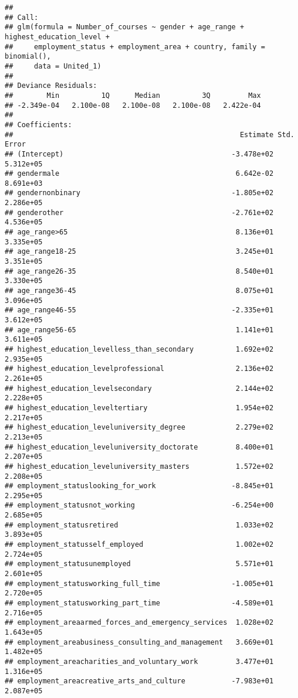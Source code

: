 \documentclass[
]{article}
\begin{document}
\begin{verbatim}
## 
## Call:
## glm(formula = Number_of_courses ~ gender + age_range + highest_education_level + 
##     employment_status + employment_area + country, family = binomial(), 
##     data = United_1)
## 
## Deviance Residuals: 
##        Min          1Q      Median          3Q         Max  
## -2.349e-04   2.100e-08   2.100e-08   2.100e-08   2.422e-04  
## 
## Coefficients:
##                                                      Estimate Std. Error
## (Intercept)                                        -3.478e+02  5.312e+05
## gendermale                                          6.642e-02  8.691e+03
## gendernonbinary                                    -1.805e+02  2.286e+05
## genderother                                        -2.761e+02  4.536e+05
## age_range>65                                        8.136e+01  3.335e+05
## age_range18-25                                      3.245e+01  3.351e+05
## age_range26-35                                      8.540e+01  3.330e+05
## age_range36-45                                      8.075e+01  3.096e+05
## age_range46-55                                     -2.335e+01  3.612e+05
## age_range56-65                                      1.141e+01  3.611e+05
## highest_education_levelless_than_secondary          1.692e+02  2.935e+05
## highest_education_levelprofessional                 2.136e+02  2.261e+05
## highest_education_levelsecondary                    2.144e+02  2.228e+05
## highest_education_leveltertiary                     1.954e+02  2.217e+05
## highest_education_leveluniversity_degree            2.279e+02  2.213e+05
## highest_education_leveluniversity_doctorate         8.400e+01  2.207e+05
## highest_education_leveluniversity_masters           1.572e+02  2.208e+05
## employment_statuslooking_for_work                  -8.845e+01  2.295e+05
## employment_statusnot_working                       -6.254e+00  2.685e+05
## employment_statusretired                            1.033e+02  3.893e+05
## employment_statusself_employed                      1.002e+02  2.724e+05
## employment_statusunemployed                         5.571e+01  2.601e+05
## employment_statusworking_full_time                 -1.005e+01  2.720e+05
## employment_statusworking_part_time                 -4.589e+01  2.716e+05
## employment_areaarmed_forces_and_emergency_services  1.028e+02  1.643e+05
## employment_areabusiness_consulting_and_management   3.669e+01  1.482e+05
## employment_areacharities_and_voluntary_work         3.477e+01  1.316e+05
## employment_areacreative_arts_and_culture           -7.983e+01  2.087e+05

\end{verbatim}
\end{document}
